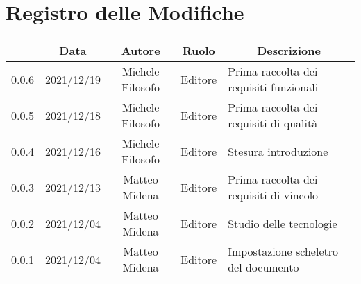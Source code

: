 \thispagestyle{empty}
\section*{Registro delle Modifiche}

\begin{center}
	\renewcommand{\arraystretch}{1.8}
	\begin{longtable}[c]{c | c | c | c | p{5cm}}
		\rowcolor[HTML]{125E28}
		\multicolumn{1}{c}{\color[HTML]{FFFFFF} \textbf{Versione}} & 
		\multicolumn{1}{c}{\color[HTML]{FFFFFF} \textbf{Data}} & 
		\multicolumn{1}{c}{\color[HTML]{FFFFFF} \textbf{Autore}} & 
		\multicolumn{1}{c}{\color[HTML]{FFFFFF} \textbf{Ruolo}} & 
		\multicolumn{1}{c}{\color[HTML]{FFFFFF} \textbf{Descrizione}} \\
		\endhead
		0.0.6 & 2021/12/19 & Michele Filosofo & Editore & Prima raccolta dei requisiti funzionali \\
		0.0.5 & 2021/12/18 & Michele Filosofo & Editore & Prima raccolta dei requisiti di qualità \\
		0.0.4 & 2021/12/16 & Michele Filosofo & Editore & Stesura introduzione \\
		0.0.3 & 2021/12/13 & Matteo Midena & Editore & Prima raccolta dei requisiti di vincolo\\
		0.0.2 & 2021/12/04 & Matteo Midena & Editore & Studio delle tecnologie\\
		0.0.1 & 2021/12/04 & Matteo Midena & Editore & Impostazione scheletro del documento\\
	\end{longtable}
\end{center}